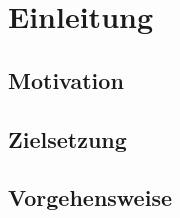 \section{Einleitung}

\subsection{Motivation}

\subsection{Zielsetzung}

\subsection{Vorgehensweise}

